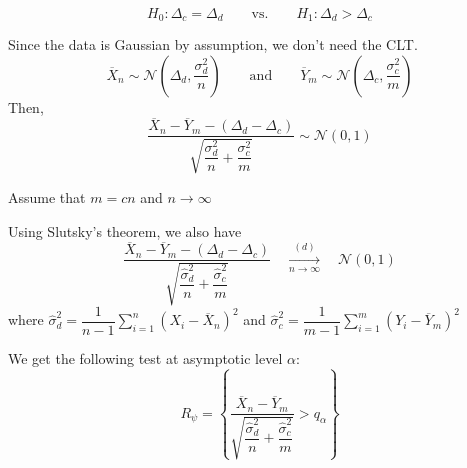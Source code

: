 \documentclass[a4paper, 10pt,landscape]{article}
\begin{document}
\begin{multicols*}{3}
\begin{description}
	\item[Hypotheses] ~
	$$H_0:\Delta_c=\Delta_d\qquad\text{vs.}\qquad H_1:\Delta_d>\Delta_c$$
	\item Since the data is Gaussian by assumption, we don't need the CLT.
	$$\overline{X}_n\sim\mathcal{N}\left(\Delta_d,\frac{\sigma_d^2}{n}\right)\qquad\text{and}\qquad\overline{Y}_m\sim\mathcal{N}\left(\Delta_c,\frac{\sigma_c^2}{m}\right)$$
	Then,
	$$\dfrac{\overline{X}_n-\overline{Y}_m-\left(\Delta_d-\Delta_c\right)}{\sqrt{\dfrac{\sigma_d^2}{n}+\dfrac{\sigma_c^2}{m}}}\sim\mathcal{N}(0,1)$$
	\item[Asymptotic test] Assume that $m=cn$ and $n\rightarrow\infty$
	\item Using Slutsky's theorem, we also have
	$$\dfrac{\overline{X}_n-\overline{Y}_m-\left(\Delta_d-\Delta_c\right)}{\sqrt{\dfrac{\widehat{\sigma}_d^2}{n}+\dfrac{\widehat{\sigma}_c^2}{m}}}\quad\xrightarrow[n\rightarrow\infty]{(d)}\quad\mathcal{N}(0,1)$$
	where $\widehat{\sigma}_d^2=\dfrac{1}{n-1}{\displaystyle\sum_{i=1}^{n}}\left(X_i-\overline{X}_n\right)^2$ and $\widehat{\sigma}_c^2=\dfrac{1}{m-1}{\displaystyle\sum_{i=1}^{m}}\left(Y_i-\overline{Y}_m\right)^2$
	\item We get the following test at asymptotic level $\alpha$:
	$$R_\psi=\left\{\dfrac{\overline{X}_n-\overline{Y}_m}{\sqrt{\dfrac{\widehat{\sigma}_d^2}{n}+\dfrac{\widehat{\sigma}_c^2}{m}}}>q_\alpha\right\}$$
\end{description}


\end{multicols*}
\end{document}
